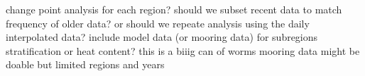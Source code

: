 \markdownRendererDocumentBegin
\markdownRendererUlBeginTight
\markdownRendererUlItem change point analysis for each region?\markdownRendererUlItemEnd 
\markdownRendererUlItem should we subset recent data to match frequency of older data? or should we repeate analysis using the daily interpolated data?\markdownRendererUlItemEnd 
\markdownRendererUlItem include model data (or mooring data) for subregions stratification or heat content? this is a biiig can of worms\markdownRendererUlItemEnd 
\markdownRendererUlItem mooring data might be doable but limited regions and years\markdownRendererUlItemEnd 
\markdownRendererUlEndTight \markdownRendererDocumentEnd